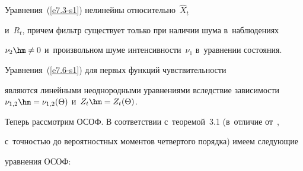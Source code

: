 Уравнения~(\ref{e7.3-s1}) нелинейны относительно~$\hat X_t$ 

и~$R_t$, причем фильтр существует только при наличии шума в~наблюдениях  

$\nu_2 \hm\ne 0$ и~произвольном шуме интенсивности~$\nu_1$ в~уравнении состояния. 

Уравнения~(\ref{e7.6-s1}) для первых функций чувствительности 

являются линейными неоднородными уравнениями вследствие зависимости $\nu_{1,2}\hm = 

\nu_{1,2} (\Theta)$ и~$ Z_t \hm= Z_t (\Theta)$.



Теперь рассмотрим ОСОФ. В соответствии с~теоремой~3.1 (в~отличие от~\cite{3-s1}, 

с~точ\-ностью до вероятностных моментов четвертого порядка)  имеем следующие 

уравнения ОСОФ:



\noindent


